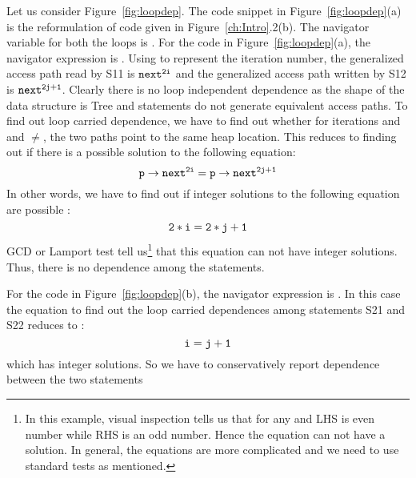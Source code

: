 \begin{example}{\rm
Let us consider Figure~\ref{fig:loopdep}. The code snippet in Figure~\ref{fig:loopdep}(a) is the 
reformulation of code given in Figure~\ref{ch:Intro}.2(b). The navigator variable for
 both the loops is . For the code in Figure~\ref{fig:loopdep}(a), the navigator expression is
  . Using  to represent the iteration number, the generalized access path read by
    S11 is \rtarrow${\tt {next}^{2i}}$ and the generalized access path written by S12 is 
    \rtarrow${\tt {next}^{2j+1}}$. Clearly there is no loop independent dependence as the shape of 
    the data structure is Tree and statements do not generate equivalent access paths. 
    To find out loop
    carried dependence, we have to find out whether for
    iterations  and  and $\neq$, the two paths point to the same
    heap location. This reduces to finding out if there is a
    possible solution to the following equation:
      \[ {\tt p\rightarrow{next}^{2i} =
      p\rightarrow{next}^{2j+1}}\] 
      In other words, we have to find out if integer solutions
      to the following equation are possible :
      \[{\tt 2*i = 2*j + 1}\]
      GCD or Lamport test tell us\footnote{In this example, visual inspection 
    tells us that for any  and  LHS is even number while RHS is an odd number. Hence the equation can not have a 
    solution. In general, the equations are more complicated and we need to use standard tests as mentioned.} that
      this equation can not have integer solutions. Thus,
      there is no dependence among the statements.
      
        For the code in Figure~\ref{fig:loopdep}(b), the navigator expression 
      is . In this case the equation to find 
      out the loop carried dependences among statements S21
      and S22 reduces to : 
      \[ {\tt i = j + 1}\]
      which has integer solutions. So we have to
      conservatively report dependence between the two statements
}
\hfill\psframebox{}  \end{example}







